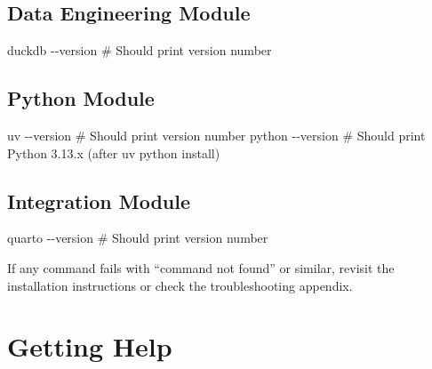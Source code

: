 \documentclass[
  letterpaper,
  DIV=11,
  numbers=noendperiod]{scrreprt}
\newenvironment{Shaded}{\begin{snugshade}}{\end{snugshade}}
\newcommand{\AttributeTok}[1]{\textcolor[rgb]{0.40,0.45,0.13}{#1}}
\newcommand{\CommentTok}[1]{\textcolor[rgb]{0.37,0.37,0.37}{#1}}
\newcommand{\ExtensionTok}[1]{\textcolor[rgb]{0.00,0.23,0.31}{#1}}
\begin{document}
\subsection*{Data Engineering Module}\label{data-engineering-module}

\begin{Shaded}
\begin{Highlighting}[]
\ExtensionTok{duckdb} \AttributeTok{{-}{-}version}     \CommentTok{\# Should print version number}
\end{Highlighting}
\end{Shaded}

\subsection*{Python Module}\label{python-module}

\begin{Shaded}
\begin{Highlighting}[]
\ExtensionTok{uv} \AttributeTok{{-}{-}version}         \CommentTok{\# Should print version number}
\ExtensionTok{python} \AttributeTok{{-}{-}version}     \CommentTok{\# Should print Python 3.13.x (after uv python install)}
\end{Highlighting}
\end{Shaded}

\subsection*{Integration Module}\label{integration-module-1}

\begin{Shaded}
\begin{Highlighting}[]
\ExtensionTok{quarto} \AttributeTok{{-}{-}version}     \CommentTok{\# Should print version number}
\end{Highlighting}
\end{Shaded}

If any command fails with ``command not found'' or similar, revisit the
installation instructions or check the troubleshooting appendix.

\section*{Getting Help}\label{getting-help}
\end{document}
